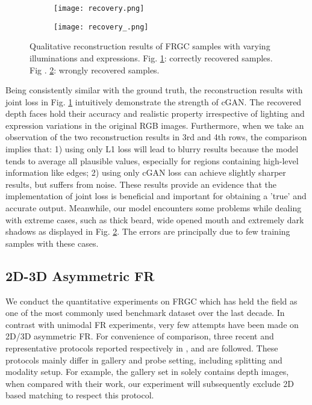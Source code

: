 \documentclass{bmvc2k}
\begin{document}
\begin{figure}
\centering
\begin{subfigure}{.75\textwidth}
\centering
\texttt{[image: recovery.png]}
\caption{}
\label{recovery_good}
\end{subfigure}%
\begin{subfigure}{.25\textwidth}
\centering
\texttt{[image: recovery\_.png]}
\caption{}
\label{recovery_bad}
\end{subfigure}
\caption{Qualitative reconstruction results of FRGC samples with varying illuminations and expressions. Fig. \ref{recovery_good}: correctly recovered samples. Fig . \ref{recovery_bad}: wrongly recovered samples.}
\label{recovery}
\end{figure}

Being consistently similar with the ground truth, the reconstruction results with joint loss in Fig. \ref{recovery_good} intuitively demonstrate the strength of cGAN. The recovered depth faces hold their accuracy and realistic property irrespective of lighting and expression variations in the original RGB images. Furthermore, when we take an observation of the two reconstruction results in 3rd and 4th rows, the comparison implies that: 1) using only L1 loss will lead to blurry results because the model tends to average all plausible values, especially for regions containing high-level information like edges; 2) using only cGAN loss can achieve slightly sharper results, but suffers from noise. These results provide an evidence that the implementation of joint loss is beneficial and important for obtaining a 'true' and accurate output. Meanwhile, our model encounters some problems while dealing with extreme cases, such as thick beard, wide opened mouth and extremely dark shadows as displayed in Fig. \ref{recovery_bad}. The errors are principally due to few training samples with these cases.

\subsection{2D-3D Asymmetric FR}

We conduct the quantitative experiments on FRGC which has held the field as one of the most commonly used benchmark dataset over the last decade. In contrast with unimodal FR experiments, very few attempts have been made on 2D/3D asymmetric FR. For convenience of comparison, three recent and representative protocols reported respectively in \cite{jin2014cross}, \cite{huang2012oriented} and \cite{wang20142d} are followed. These protocols mainly differ in gallery and probe setting, including splitting and modality setup. For example, the gallery set in \cite{wang20142d} solely contains depth images, when compared with their work, our experiment will subsequently exclude 2D based matching to respect this protocol.
\end{document}
